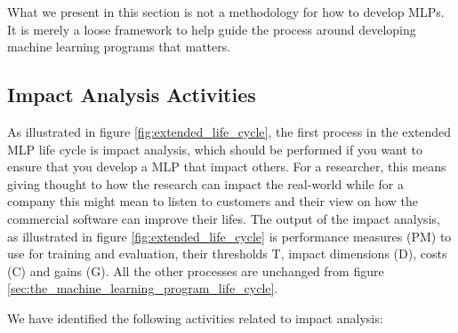 \documentclass{article}
\begin{document}
What we present in this section is not a methodology for how to develop MLPs.
It is merely a loose framework to help guide the process around developing machine learning programs that matters.
%

\subsection{Impact Analysis Activities}
As illustrated in figure \ref{fig:extended_life_cycle}, the first process in the extended MLP life cycle is impact analysis, which should be performed if you want to ensure that you develop a MLP that impact others.
For a researcher, this means giving thought to how the research can impact the real-world while for a company this might mean to listen to customers and their view on how the commercial software can improve their lifes.
The output of the impact analysis, as illustrated in figure \ref{fig:extended_life_cycle} is performance measures (PM) to use for training and evaluation, their thresholds T, impact dimensions (D), costs (C) and gains (G).
All the other processes are unchanged from figure \ref{sec:the_machine_learning_program_life_cycle}.

We have identified the following activities related to impact analysis:
\end{document}
